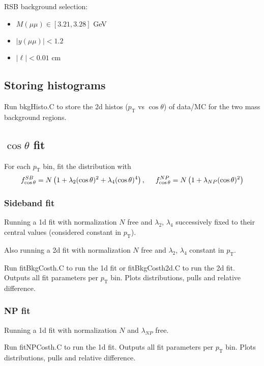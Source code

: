 \documentclass{article}
\newcommand{\pt}{p_\text{T}}
\newcommand{\cost}{\cos\theta}
\begin{document}
RSB background selection:
\begin{itemize}
\item $M(\mu\mu)\in[3.21,3.28]$ GeV
\item $|y(\mu\mu)|<1.2$
\item $|\ell| < 0.01$ cm
\end{itemize}

\subsection{Storing histograms}

Run bkgHisto.C to store the 2d histos ($\pt$ vs $\cost$) of data/MC for the two mass background regions.

\subsection{$\cost$ fit}

For each $\pt$ bin, fit the distribution with
\begin{equation}
f_{\cost}^{SB} = N\left(1+\lambda_2(\cost)^2+\lambda_4(\cost)^4\right),\hspace{0.5cm}f_{\cost}^{NP} = N\left(1+\lambda_{NP}(\cost)^2\right)
\end{equation}

\subsubsection{Sideband fit}

Running a 1d fit with normalization $N$ free and $\lambda_2$, $\lambda_4$ successively fixed to their central values (considered constant in $\pt$).

Also running a 2d fit with normalization $N$ free and $\lambda_2$, $\lambda_4$ constant in $\pt$.

Run fitBkgCosth.C to run the 1d fit or fitBkgCosth2d.C to run the 2d fit. Outputs all fit parameters per $\pt$ bin. Plots distributions, pulls and relative difference.

\subsubsection{NP fit}

Running a 1d fit with normalization $N$ and $\lambda_{NP}$ free.

Run fitNPCosth.C to run the 1d fit. Outputs all fit parameters per $\pt$ bin. Plots distributions, pulls and relative difference.
\end{document}
